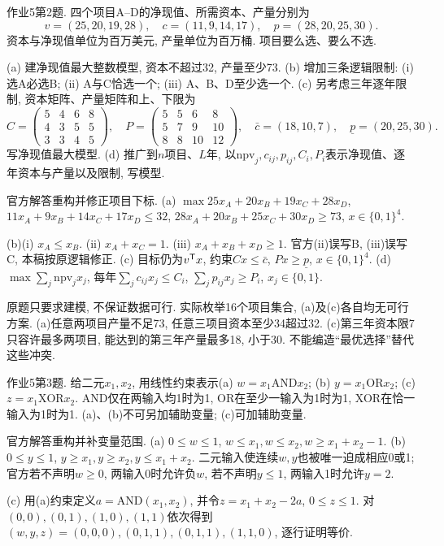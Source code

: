 \begin{exercise}\label{ass:15053-ps5-q2}
作业5第2题. 四个项目A--D的净现值、所需资本、产量分别为
\[
v=(25,20,19,28),\quad c=(11,9,14,17),\quad p=(28,20,25,30).
\]
资本与净现值单位为百万美元, 产量单位为百万桶. 项目要么选、要么不选.

(a) 建净现值最大整数模型, 资本不超过32, 产量至少73. (b) 增加三条逻辑限制: (i) 选A必选B; (ii) A与C恰选一个; (iii) A、B、D至少选一个. (c) 另考虑三年逐年限制, 资本矩阵、产量矩阵和上、下限为
\[
C=\begin{pmatrix}5&4&6&8\\4&3&5&5\\3&3&4&5\end{pmatrix},\quad
P=\begin{pmatrix}5&5&6&8\\5&7&9&10\\8&8&10&12\end{pmatrix},
\quad \bar c=(18,10,7),\quad\underline p=(20,25,30).
\]
写净现值最大模型. (d) 推广到$n$项目、$L$年, 以$\mathrm{npv}_j,c_{ij},p_{ij},C_i,P_i$表示净现值、逐年资本与产量以及限制, 写模型.
\end{exercise}
\begin{solution}
官方解答重构并修正项目下标. (a) $\max25x_A+20x_B+19x_C+28x_D$, $11x_A+9x_B+14x_C+17x_D\le32$, $28x_A+20x_B+25x_C+30x_D\ge73$, $x\in\{0,1\}^4$.

(b)(i) $x_A\le x_B$. (ii) $x_A+x_C=1$. (iii) $x_A+x_B+x_D\ge1$. 官方(ii)误写B, (iii)误写C, 本稿按原逻辑修正. (c) 目标仍为$v^{\mathsf T} x$, 约束$Cx\le\bar c$, $Px\ge\underline p$, $x\in\{0,1\}^4$. (d) $\max\sum_j\mathrm{npv}_jx_j$, 每年$\sum_jc_{ij}x_j\le C_i$, $\sum_jp_{ij}x_j\ge P_i$, $x_j\in\{0,1\}$.

原题只要求建模, 不保证数据可行. 实际枚举16个项目集合, (a)及(c)各自均无可行方案. (a)任意两项目产量不足73, 任意三项目资本至少34超过32. (c)第三年资本限7只容许最多两项目, 能达到的第三年产量最多18, 小于30. 不能编造“最优选择”替代这些冲突.
\end{solution}

\begin{exercise}\label{ass:15053-ps5-q3}
作业5第3题. 给二元$x_1,x_2$, 用线性约束表示(a) $w=x_1\mathbin{\mathrm{AND}}x_2$; (b) $y=x_1\mathbin{\mathrm{OR}}x_2$; (c) $z=x_1\mathbin{\mathrm{XOR}}x_2$. AND仅在两输入均1时为1, OR在至少一输入为1时为1, XOR在恰一输入为1时为1. (a)、(b)不可另加辅助变量; (c)可加辅助变量.
\end{exercise}
\begin{solution}
官方解答重构并补变量范围. (a) $0\le w\le1$, $w\le x_1,w\le x_2,w\ge x_1+x_2-1$. (b) $0\le y\le1$, $y\ge x_1,y\ge x_2,y\le x_1+x_2$. 二元输入使连续$w,y$也被唯一迫成相应0或1; 官方若不声明$w\ge0$, 两输入0时允许负$w$, 若不声明$y\le1$, 两输入1时允许$y=2$.

(c) 用(a)约束定义$a=\mathrm{AND}(x_1,x_2)$, 并令$z=x_1+x_2-2a$, $0\le z\le1$. 对$(0,0),(0,1),(1,0),(1,1)$依次得到$(w,y,z)=(0,0,0),(0,1,1),(0,1,1),(1,1,0)$, 逐行证明等价.
\end{solution}

